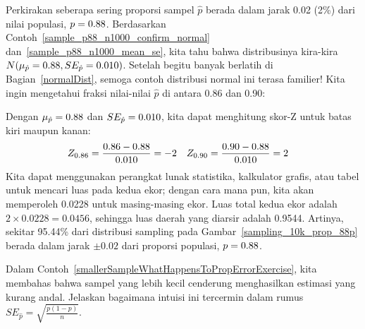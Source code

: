\begin{examplewrap}
\begin{nexample}{Perkirakan seberapa sering proporsi sampel
$\hat{p}$ berada dalam jarak 0.02 (2\%) dari nilai populasi,
$p = 0.88{}$. Berdasarkan
Contoh~\ref{sample_p88_n1000_confirm_normal}
dan~\ref{sample_p88_n1000_mean_se},
kita tahu bahwa distribusinya kira-kira
$N(\mu_{\hat{p}} = 0.88{}, SE_{\hat{p}} = 0.010{})$.}
\label{sampling_10k_prop_887p-prop_from_867_to_907}
Setelah begitu banyak berlatih di Bagian~\ref{normalDist},
semoga contoh distribusi normal ini terasa familier!
Kita ingin mengetahui fraksi nilai-nilai $\hat{p}$
di antara 0.86 dan 0.90:
\begin{center}
\end{center}
Dengan $\mu_{\hat{p}} = 0.88{}$ dan
$SE_{\hat{p}} = 0.010{}$,
kita dapat menghitung skor-Z untuk batas kiri maupun kanan:
\begin{align*}
Z_{0.86}
  &= \frac{0.86 - 0.88{}}{0.010{}}
  = -2
&Z_{0.90}
  &= \frac{0.90 - 0.88{}}{0.010{}}
  = 2
\end{align*}
Kita dapat menggunakan perangkat lunak statistika, kalkulator grafis,
atau tabel untuk mencari luas pada kedua ekor; dengan cara mana pun,
kita akan memperoleh 0.0228 untuk masing-masing ekor. Luas total kedua ekor adalah
$2 \times 0.0228 = 0.0456$, sehingga luas daerah yang diarsir adalah
0.9544. Artinya, sekitar 95.44\% dari distribusi sampling
pada Gambar~\ref{sampling_10k_prop_88p} berada dalam jarak $\pm0.02$
dari proporsi populasi, $p = 0.88{}$.
\end{nexample}
\end{examplewrap}

\D{\newpage}

\begin{exercisewrap}
\begin{nexercise}
Dalam Contoh~\ref{smallerSampleWhatHappensToPropErrorExercise},
kita membahas bahwa sampel yang lebih kecil cenderung
menghasilkan estimasi yang kurang andal. Jelaskan bagaimana intuisi ini
tercermin dalam rumus
$SE_{\hat{p}} = \sqrt{\frac{p (1 - p)}{n}}$.\footnotemark
\end{nexercise}
\end{exercisewrap}


